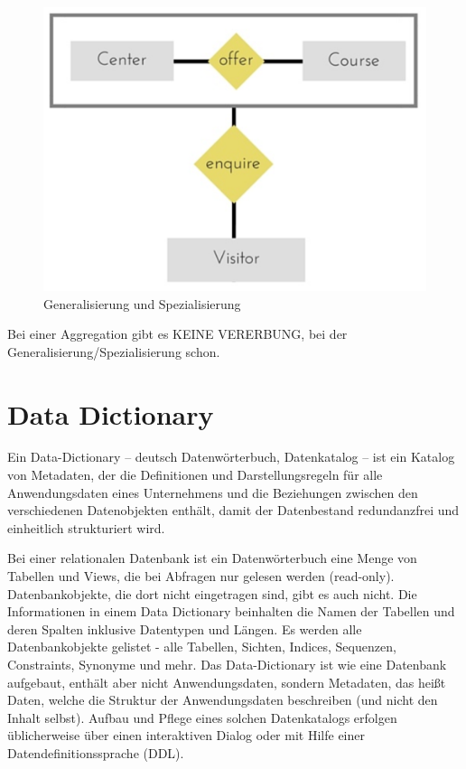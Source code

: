 \begin{figure}[h]
    \centering
    \includegraphics[width=.8\textwidth]{Content/images/modellierung/spez.png}
    \caption{Generalisierung und Spezialisierung}
    \label{fig:modellierung:special}
\end{figure}

Bei einer Aggregation gibt es KEINE VERERBUNG, bei der Generalisierung/Spezialisierung schon.

\section{Data Dictionary}

Ein Data-Dictionary – deutsch Datenwörterbuch, Datenkatalog – ist ein Katalog von Metadaten, der die Definitionen und Darstellungsregeln für alle Anwendungsdaten eines Unternehmens und die Beziehungen zwischen den verschiedenen Datenobjekten enthält, damit der Datenbestand redundanzfrei und einheitlich strukturiert wird. 

Bei einer relationalen Datenbank ist ein Datenwörterbuch eine Menge von Tabellen und Views, die bei Abfragen nur gelesen werden (read-only). Datenbankobjekte, die dort nicht eingetragen sind, gibt es auch nicht. Die Informationen in einem Data Dictionary beinhalten die Namen der Tabellen und deren Spalten inklusive Datentypen und Längen. Es werden alle Datenbankobjekte gelistet - alle Tabellen, Sichten, Indices, Sequenzen, Constraints, Synonyme und mehr. Das Data-Dictionary ist wie eine Datenbank aufgebaut, enthält aber nicht Anwendungsdaten, sondern Metadaten, das heißt Daten, welche die Struktur der Anwendungsdaten beschreiben (und nicht den Inhalt selbst). Aufbau und Pflege eines solchen Datenkatalogs erfolgen üblicherweise über einen interaktiven Dialog oder mit Hilfe einer Datendefinitionssprache (DDL).

